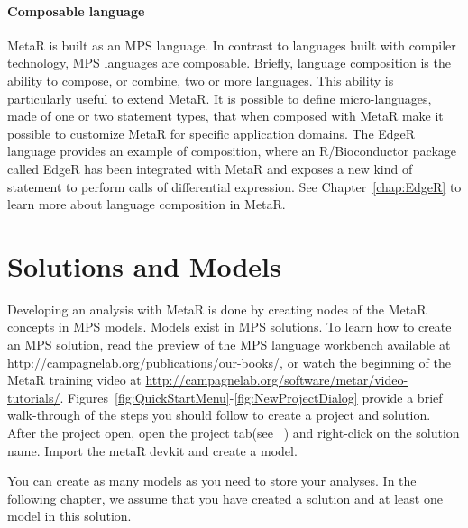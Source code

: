 \paragraph{Composable language}
MetaR is built as an MPS language. In contrast to languages built with compiler technology, MPS languages are composable. Briefly, language composition is the ability to compose, or combine, two or more languages. This ability is particularly useful to extend MetaR. It is possible to define micro-languages, made of one or two statement types, that when composed with MetaR make it possible to customize MetaR for specific application domains. The EdgeR language provides an example of composition, where an R/Bioconductor package called EdgeR has been integrated with MetaR and exposes a new kind of statement to perform calls of differential expression. See Chapter~\ref{chap:EdgeR} to learn more about language composition in MetaR.
  
\section{Solutions and Models}
Developing an analysis with MetaR is done by creating nodes of the MetaR concepts in MPS models. Models exist in MPS solutions. To learn how to create an MPS solution, read the preview of the MPS language workbench available at \url{http://campagnelab.org/publications/our-books/}\cite{campagne2014mps}, or watch the beginning of the MetaR training video at \url{http://campagnelab.org/software/metar/video-tutorials/}. Figures~\ref{fig:QuickStartMenu}-\ref{fig:NewProjectDialog} provide a brief walk-through of the steps you should follow to create a project and solution. After the project open, open the project tab(see ~\cite{campagne2014mps}) and right-click on the solution name. Import the metaR devkit and create a model. 

You can create as many models as you need to store your analyses. In the following chapter, we assume that you have created a solution and at least one model in this solution. 



